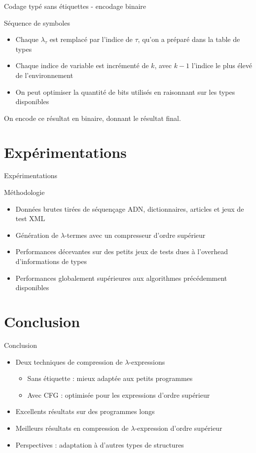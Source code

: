 \documentclass{beamer}
\begin{document}
\begin{frame}{Codage typé sans étiquettes - encodage binaire}
\begin{block}{Séquence de symboles}
\begin{itemize}
    \item Chaque $\lambda_\tau$ est remplacé par l'indice de $\tau$, qu'on a préparé dans la table de types \item Chaque indice de variable est incrémenté de $k$, avec $k-1$ l'indice le plus élevé de l'environnement
    \item On peut optimiser la quantité de bits utilisés en raisonnant sur les types disponibles 
\end{itemize}
\end{block}
On encode ce résultat en binaire, donnant le résultat final.
\end{frame}

\section{Expérimentations}

\begin{frame}{Expérimentations}
\begin{block}{Méthodologie}
\begin{itemize}
\item Données brutes tirées de séquençage ADN, dictionnaires, articles et jeux de test XML
\item Génération de $\lambda$-termes avec un compresseur d'ordre supérieur
\end{itemize}
\end{block}
\pause
\begin{itemize}
\item Performances décevantes sur des petits jeux de tests dues à l'overhead d'informations de types
\item Performances globalement supérieures aux algorithmes précédemment disponibles
\end{itemize}
\end{frame}

\section{Conclusion}

\begin{frame}{Conclusion}
\begin{itemize}
\item Deux techniques de compression de $\lambda$-expressions
    \begin{itemize}
      \item Sans étiquette : mieux adaptée aux petits programmes
      \item Avec CFG : optimisée pour les expressions d'ordre supérieur
    \end{itemize}
\item Excellents résultats sur des programmes longs
\item Meilleurs résultats en compression de $\lambda$-expression d'ordre supérieur
\item Perspectives : adaptation à d'autres types de structures
\end{itemize}
\end{frame}
\end{document}
